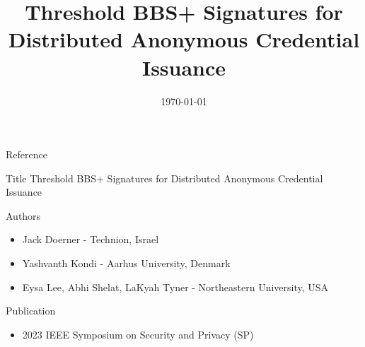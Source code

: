 \documentclass[
	xcolor={svgnames},
	hyperref={pagebackref,bookmarks},
	aspectratio=43,
]{beamer}
\title[]{Threshold BBS+ Signatures for Distributed Anonymous Credential Issuance}
\title{\presentationtitle}
\author{\presenter}
\institute[IITH]{
	\university\\
}
\date{\today}
\begin{document}

\newcommand{\brak}[1]{\ensuremath{\left( #1 \right)}}
\newcommand{\sbrak}[1]{\ensuremath{\left[ #1 \right]}}
\newcommand{\Exp}[1]{\ensuremath{\mathbb{E} \left[ #1 \right]}}
\newcommand{\Var}[1]{\ensuremath{\text{Var} \left[ #1 \right]}}
\newcommand{\uar}{\stackrel{\$}{\leftarrow}}

\newcommand*{\colorboxed}{}
\def\colorboxed#1#{%
  \colorboxedAux{#1}%
}
\newcommand*{\colorboxedAux}[3]{%
  \begingroup
    \colorlet{cb@saved}{.}%
    \color#1{#2}%
    \boxed{%
      \color{cb@saved}%
      #3%
    }%
  \endgroup
}


\begin{frame}
	\titlepage
\end{frame}

\begin{frame}{Reference}
	\begin{block}{Title}
		Threshold BBS+ Signatures for Distributed Anonymous Credential Issuance
	\end{block}
	\begin{block}{Authors}
		\begin{itemize}
			\item Jack Doerner - Technion, Israel
			\item Yashvanth Kondi - Aarhus University, Denmark
			\item Eysa Lee, Abhi Shelat, LaKyah Tyner - Northeastern University, USA
		\end{itemize}
	\end{block}
	\begin{block}{Publication}
		\begin{itemize}
			\item 2023 IEEE Symposium on Security and Privacy (SP)
		\end{itemize}
	\end{block}
\end{frame}
\end{document}
